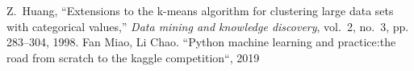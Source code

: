 \begin{thebibliography}{99}

Z.~Huang, ``Extensions to the k-means algorithm for clustering large data sets
  with categorical values,'' \emph{Data mining and knowledge discovery},
  vol.~2, no.~3, pp. 283--304, 1998.
 Fan Miao, Li Chao. ``Python machine learning and practice:the road from scratch to the kaggle competition``, 2019
\end{thebibliography}